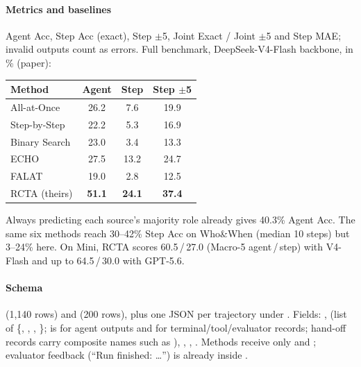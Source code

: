 \paragraph{Metrics and baselines} Agent Acc, Step Acc (exact), Step $\pm$5, Joint Exact / Joint $\pm$5 and Step MAE; invalid outputs count as errors. Full benchmark, DeepSeek-V4-Flash backbone, in \% (paper):

\begin{center}\small
\begin{tabular}{@{}lccc@{}}\toprule
Method & Agent & Step & Step $\pm$5\\\midrule
All-at-Once & 26.2 & 7.6 & 19.9\\
Step-by-Step & 22.2 & 5.3 & 16.9\\
Binary Search & 23.0 & 3.4 & 13.3\\
ECHO & 27.5 & 13.2 & 24.7\\
FALAT & 19.0 & 2.8 & 12.5\\
RCTA (theirs) & \textbf{51.1} & \textbf{24.1} & \textbf{37.4}\\\bottomrule
\end{tabular}
\end{center}
Always predicting each source's majority role already gives 40.3\% Agent Acc. The same six methods reach 30--42\% Step Acc on Who\&When (median 10 steps) but 3--24\% here. On Mini, RCTA scores 60.5\,/\,27.0 (Macro-5 agent\,/\,step) with V4-Flash and up to 64.5\,/\,30.0 with GPT-5.6.

\paragraph{Schema}  (1,140 rows) and  (200 rows), plus one JSON per trajectory under . Fields: ,  (list of \{, , , \};  is  for agent outputs and  for terminal/tool/evaluator records; hand-off records carry composite names such as ), , , . Methods receive only  and ; evaluator feedback (``Run finished: \ldots'') is already inside .

